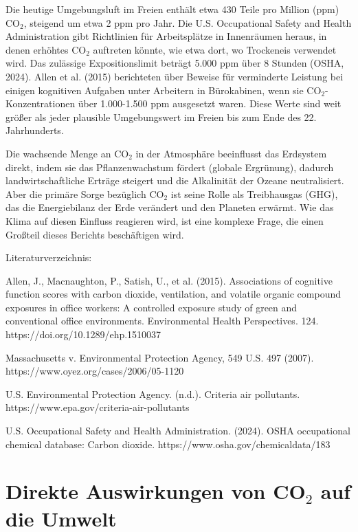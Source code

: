 \documentclass[12pt,paper=a4,DIV=12,parskip=never,chapterprefix=false,headings=standardclasses]{scrreprt}
\numberwithin{figure}{chapter}
\begin{document}
Die heutige Umgebungsluft im Freien enthält etwa 430 Teile pro Million (ppm) CO$_2$, steigend um etwa 2 ppm pro Jahr. Die U.S. Occupational Safety and Health Administration gibt Richtlinien für Arbeitsplätze in Innenräumen heraus, in denen erhöhtes CO$_2$ auftreten könnte, wie etwa dort, wo Trockeneis verwendet wird. Das zulässige Expositionslimit beträgt 5.000 ppm über 8 Stunden (OSHA, 2024). Allen et al. (2015) berichteten über Beweise für verminderte Leistung bei einigen kognitiven Aufgaben unter Arbeitern in Bürokabinen, wenn sie CO$_2$-Konzentrationen über 1.000-1.500 ppm ausgesetzt waren. Diese Werte sind weit größer als jeder plausible Umgebungswert im Freien bis zum Ende des 22. Jahrhunderts.

Die wachsende Menge an CO$_2$ in der Atmosphäre beeinflusst das Erdsystem direkt, indem sie das Pflanzenwachstum fördert (globale Ergrünung), dadurch landwirtschaftliche Erträge steigert und die Alkalinität der Ozeane neutralisiert. Aber die primäre Sorge bezüglich CO$_2$ ist seine Rolle als Treibhausgas (GHG), das die Energiebilanz der Erde verändert und den Planeten erwärmt. Wie das Klima auf diesen Einfluss reagieren wird, ist eine komplexe Frage, die einen Großteil dieses Berichts beschäftigen wird.

\vfill
Literaturverzeichnis:

Allen, J., Macnaughton, P., Satish, U., et al. (2015). Associations of cognitive function scores with carbon dioxide, ventilation, and volatile organic compound exposures in office workers: A controlled exposure study of green and conventional office environments. Environmental Health Perspectives. 124. https://doi.org/10.1289/ehp.1510037

Massachusetts v. Environmental Protection Agency, 549 U.S. 497 (2007).\\ https://www.oyez.org/cases/2006/05-1120

U.S. Environmental Protection Agency. (n.d.). Criteria air pollutants.\\ https://www.epa.gov/criteria-air-pollutants

U.S. Occupational Safety and Health Administration. (2024). OSHA occupational chemical database: Carbon dioxide. https://www.osha.gov/chemicaldata/183

\chapter{Direkte Auswirkungen von CO$_2$ auf die Umwelt}
\end{document}
